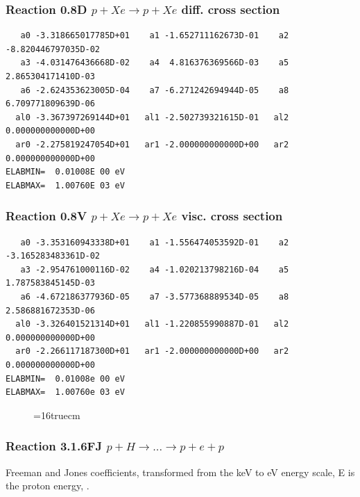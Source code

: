 \documentclass[12pt,dvips]{article}
\begin{document}
\subsubsection{
Reaction 0.8D    $p + Xe \rightarrow p + Xe  $ diff. cross
section }


\begin{small}\begin{verbatim}
   a0 -3.318665017785D+01    a1 -1.652711162673D-01    a2 -8.820446797035D-02
   a3 -4.031476436668D-02    a4  4.816376369566D-03    a5  2.865304171410D-03
   a6 -2.624353623005D-04    a7 -6.271242694944D-05    a8  6.709771809639D-06
  al0 -3.367397269144D+01   al1 -2.502739321615D-01   al2  0.000000000000D+00
  ar0 -2.275819247054D+01   ar1 -2.000000000000D+00   ar2  0.000000000000D+00
ELABMIN=  0.01008E 00 eV
ELABMAX=  1.00760E 03 eV
\end{verbatim}\end{small}

\subsubsection{
Reaction 0.8V   $ p + Xe \rightarrow p + Xe  $ visc. cross
section }


\begin{small}\begin{verbatim}
   a0 -3.353160943338D+01    a1 -1.556474053592D-01    a2 -3.165283483361D-02
   a3 -2.954761000116D-02    a4 -1.020213798216D-04    a5  1.787583845145D-03
   a6 -4.672186377936D-05    a7 -3.577368889534D-05    a8  2.586881672353D-06
  al0 -3.326401521314D+01   al1 -1.220855990887D-01   al2  0.000000000000D+00
  ar0 -2.266117187300D+01   ar1 -2.000000000000D+00   ar2  0.000000000000D+00
ELABMIN=  0.01008e 00 eV
ELABMAX=  1.00760e 03 eV
\end{verbatim}\end{small}


\begin{figure} \label{0.8}
\epsfxsize=16truecm
\end{figure}
\newpage



\subsubsection{
Reaction 3.1.6FJ
$ p + H \rightarrow . . . \rightarrow p + e + p $ }

Freeman and Jones coefficients, transformed from the keV to eV energy scale,
E is the proton energy, \cite{kn:Freeman}.
\end{document}
